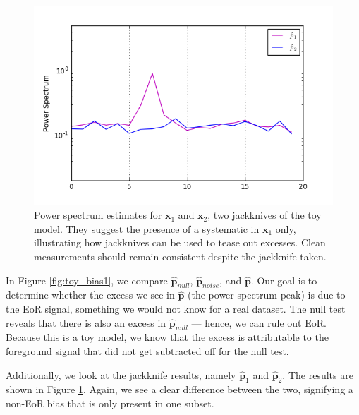 \documentclass[preprint2,numberedappendix,tighten]{aastex6}  %
\begin{document}
\begin{figure}
	\centering
	\includegraphics[trim={0.3cm 0.3cm 0.3cm 0.3cm},width=\columnwidth]{plots/toy_bias2.png}
	\caption{Power spectrum estimates for $\textbf{x}_{1}$ and $\textbf{x}_{2}$, two jackknives of the toy model. They suggest the presence of a systematic in $\textbf{x}_{1}$ only, illustrating how jackknives can be used to tease out excesses. Clean measurements should remain consistent despite the jackknife taken.}
	\label{fig:toy_bias2}
\end{figure}

In Figure \ref{fig:toy_bias1}, we compare $\hat{\textbf{p}}_{null}$, $\hat{\textbf{p}}_{noise}$, and $\hat{\textbf{p}}$. Our goal is to determine whether the excess we see in $\hat{\textbf{p}}$ (the power spectrum peak) is due to the EoR signal, something we would not know for a real dataset. The null test reveals that there is also an excess in $\hat{\textbf{p}}_{null}$ --- hence, we can rule out EoR. Because this is a toy model, we know that the excess is attributable to the foreground signal that did not get subtracted off for the null test. 

Additionally, we look at the jackknife results, namely $\hat{\textbf{p}}_{1}$ and $\hat{\textbf{p}}_{2}$. The results are shown in Figure \ref{fig:toy_bias2}. Again, we see a clear difference between the two, signifying a non-EoR bias that is only present in one subset. 
\end{document}
